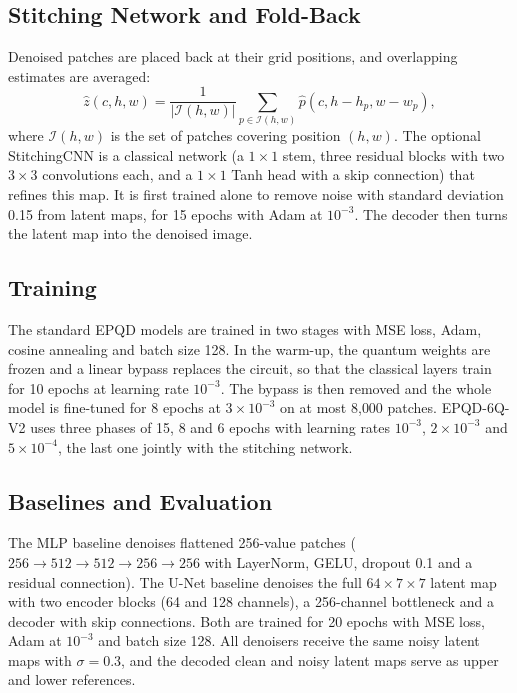 \documentclass[runningheads]{llncs}
\begin{document}
\subsection{Stitching Network and Fold-Back}
Denoised patches are placed back at their grid positions, and overlapping estimates are averaged:
\begin{equation}
    \hat z(c,h,w)=
    \frac{1}{|\mathcal{I}(h,w)|}\sum_{p\in\mathcal{I}(h,w)}\hat p(c,h-h_p,w-w_p),
\end{equation}
where $\mathcal{I}(h,w)$ is the set of patches covering position $(h,w)$. The optional StitchingCNN is a classical network (a $1\times1$ stem, three residual blocks with two $3\times3$ convolutions each, and a $1\times1$ Tanh head with a skip connection) that refines this map. It is first trained alone to remove noise with standard deviation 0.15 from latent maps, for 15 epochs with Adam at $10^{-3}$. The decoder then turns the latent map into the denoised image.

\subsection{Training}
The standard EPQD models are trained in two stages with MSE loss, Adam, cosine annealing and batch size 128. In the warm-up, the quantum weights are frozen and a linear bypass replaces the circuit, so that the classical layers train for 10 epochs at learning rate $10^{-3}$. The bypass is then removed and the whole model is fine-tuned for 8 epochs at $3\times10^{-3}$ on at most 8{,}000 patches. EPQD-6Q-V2 uses three phases of 15, 8 and 6 epochs with learning rates $10^{-3}$, $2\times10^{-3}$ and $5\times10^{-4}$, the last one jointly with the stitching network.

\subsection{Baselines and Evaluation}
The MLP baseline denoises flattened 256-value patches ($256\rightarrow512\rightarrow512\rightarrow256\rightarrow256$ with LayerNorm, GELU, dropout 0.1 and a residual connection). The U-Net baseline denoises the full $64\times7\times7$ latent map with two encoder blocks (64 and 128 channels), a 256-channel bottleneck and a decoder with skip connections. Both are trained for 20 epochs with MSE loss, Adam at $10^{-3}$ and batch size 128. All denoisers receive the same noisy latent maps with $\sigma=0.3$, and the decoded clean and noisy latent maps serve as upper and lower references.
\end{document}
